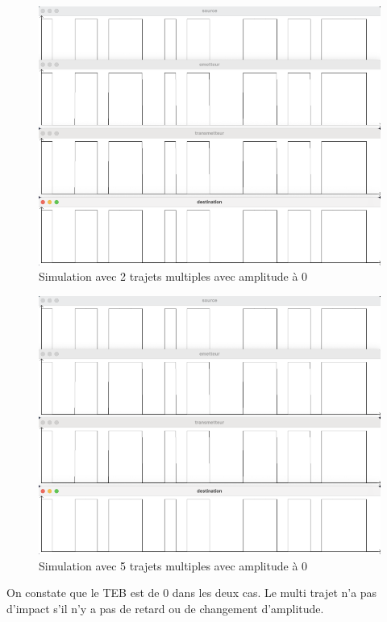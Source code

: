 \begin{figure}[H]
\centering
\includegraphics[width=\textwidth]{img/nulledecalage.png}
\caption{\label{fig:image25}Simulation avec 2 trajets multiples avec amplitude à 0}
\end{figure}

\begin{figure}[H]
\centering
\includegraphics[width=\textwidth]{img/nulledecalage.png}
\caption{\label{fig:image25}Simulation avec 5 trajets multiples avec amplitude à 0}
\end{figure}

On constate que le TEB est de 0 dans les deux cas. Le multi trajet n'a pas d'impact s'il n'y a pas de retard ou de changement d'amplitude.


